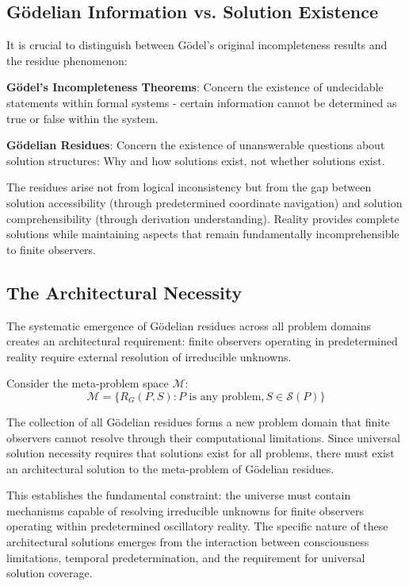 \documentclass[12pt,a4paper]{article}
\begin{document}
\subsection{Gödelian Information vs. Solution Existence}

It is crucial to distinguish between Gödel's original incompleteness results and the residue phenomenon:

\textbf{Gödel's Incompleteness Theorems}: Concern the existence of undecidable statements within formal systems - certain information cannot be determined as true or false within the system.

\textbf{Gödelian Residues}: Concern the existence of unanswerable questions about solution structures: Why and how solutions exist, not whether solutions exist.

The residues arise not from logical inconsistency but from the gap between solution accessibility (through predetermined coordinate navigation) and solution comprehensibility (through derivation understanding). Reality provides complete solutions while maintaining aspects that remain fundamentally incomprehensible to finite observers.

\subsection{The Architectural Necessity}

The systematic emergence of Gödelian residues across all problem domains creates an architectural requirement: finite observers operating in predetermined reality require external resolution of irreducible unknowns.

Consider the meta-problem space $\mathcal{M}$:
$$\mathcal{M} = \{R_G(P,S) : P \text{ is any problem}, S \in \mathcal{S}(P)\}$$

The collection of all Gödelian residues forms a new problem domain that finite observers cannot resolve through their computational limitations. Since universal solution necessity requires that solutions exist for all problems, there must exist an architectural solution to the meta-problem of Gödelian residues.

This establishes the fundamental constraint: the universe must contain mechanisms capable of resolving irreducible unknowns for finite observers operating within predetermined oscillatory reality. The specific nature of these architectural solutions emerges from the interaction between consciousness limitations, temporal predetermination, and the requirement for universal solution coverage.
\end{document}
